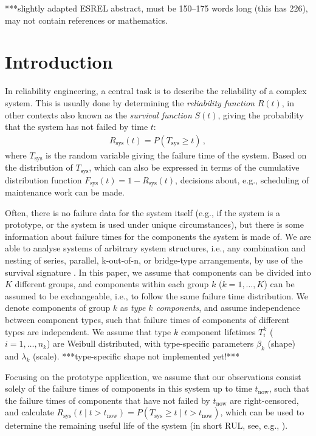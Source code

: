 \documentclass[Journal,SectionNumbers,SingleSpace,InsideFigs]{ascelike}
\newcommand{\Rsys}{R_\text{sys}}
\def\Rsys{R_\text{sys}}
\def\Tsys{T_\text{sys}}
\def\tnow{t_\text{now}}
\begin{document}

***slightly adapted ESREL abstract, must be 150--175 words long (this has 226), may not contain references or mathematics.


\section{Introduction}

In reliability engineering, a central task is to describe the reliability of a complex system.
This is usually done by determining the \emph{reliability function} $R(t)$,
in other contexts also known as the \emph{survival function} $S(t)$,
giving the probability that the system has not failed by time $t$:
\begin{align}
\Rsys(t) = P(\Tsys \geq t)\,,
\end{align}
where $\Tsys$ is the random variable giving the failure time of the system. %
Based on the distribution of $\Tsys$, which can also be expressed
in terms of the cumulative distribution function $F_\text{sys}(t) = 1 - \Rsys(t)$,
decisions about, e.g., scheduling of maintenance work can be made.

Often, there is no failure data for the system itself
(e.g., if the system is a prototype, or the system is used under unique circumstances),
but there is some information about failure times for the components the system is made of.
We are able to analyse systems of arbitrary system structures, %
i.e., any combination and nesting of series, parallel, k-out-of-n, or bridge-type arrangements,
by use of the survival signature \cite{2012:survsign}.
In this paper, we assume that components can be divided into $K$ different groups,
and components within each group $k$ ($k=1, \ldots, K$) can be assumed to be exchangeable,
i.e., to follow the same failure time distribution.
We denote components of group $k$ as \emph{type $k$ components},
and assume independence between component types,
such that failure times of components of different types are independent.
We assume that type $k$ component lifetimes $T_i^k$ ($i = 1, \ldots, n_k$)
are Weibull distributed, with type-specific parameters $\beta_k$ (shape) and $\lambda_k$ (scale).
***type-specific shape not implemented yet!***

Focusing on the prototype application,
we assume that our observations consist solely of the failure times of components in this system up to time $\tnow$,
such that the failure times of components that have not failed by $\tnow$ are right-censored,
and calculate $\Rsys(t \mid t > \tnow) = P(\Tsys \geq t \mid t > \tnow)$,
which can be used to determine the remaining useful life of the system
(in short RUL, see, e.g., ).
\end{document}
